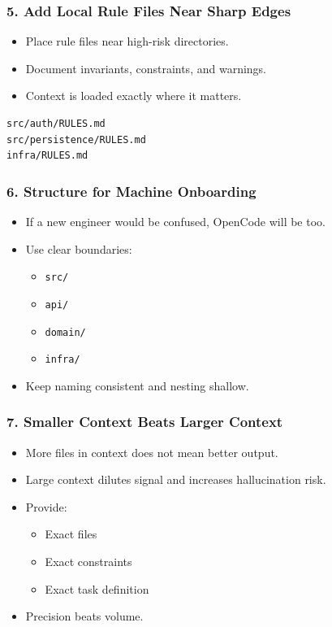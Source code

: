 \begin{frame}[fragile]\frametitle{5. Add Local Rule Files Near Sharp Edges}
  \begin{itemize}
    \item Place rule files near high-risk directories.
    \item Document invariants, constraints, and warnings.
    \item Context is loaded exactly where it matters.
  \end{itemize}

\begin{lstlisting}
src/auth/RULES.md
src/persistence/RULES.md
infra/RULES.md
\end{lstlisting}
\end{frame}

\begin{frame}[fragile]\frametitle{6. Structure for Machine Onboarding}
  \begin{itemize}
    \item If a new engineer would be confused, OpenCode will be too.
    \item Use clear boundaries:
    \begin{itemize}
        \item \texttt{src/}
        \item \texttt{api/}
        \item \texttt{domain/}
        \item \texttt{infra/}
    \end{itemize}
    \item Keep naming consistent and nesting shallow.
  \end{itemize}
\end{frame}

\begin{frame}[fragile]\frametitle{7. Smaller Context Beats Larger Context}
  \begin{itemize}
    \item More files in context does not mean better output.
    \item Large context dilutes signal and increases hallucination risk.
    \item Provide:
    \begin{itemize}
        \item Exact files
        \item Exact constraints
        \item Exact task definition
    \end{itemize}
    \item Precision beats volume.
  \end{itemize}
\end{frame}

